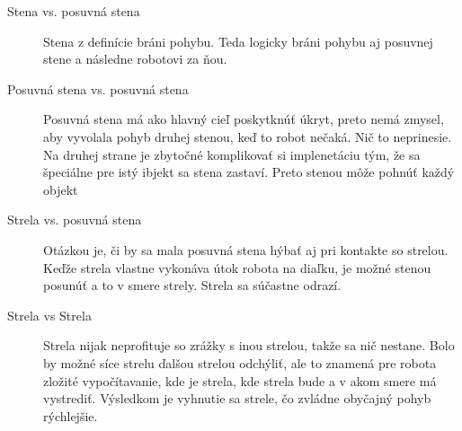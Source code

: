 \begin{description}
\item[Stena vs. posuvná stena] Stena z definície bráni pohybu. Teda logicky bráni pohybu aj posuvnej stene a následne robotovi za ňou.
\item[Posuvná stena vs. posuvná stena] Posuvná stena má ako hlavný cieľ poskytknúť úkryt, preto nemá zmysel, aby vyvolala pohyb druhej stenou, keď to robot nečaká. Nič to neprinesie. Na druhej strane je zbytočné komplikovať si implenetáciu tým, že sa špeciálne pre istý ibjekt sa stena zastaví. Preto stenou môže pohnúť každý objekt
\item[Strela vs. posuvná stena] Otázkou je, či by sa mala posuvná stena hýbať aj pri kontakte so strelou. Keďže strela vlastne vykonáva útok robota na diaľku, je možné stenou posunúť a to v smere strely. Strela sa súčastne odrazí. %
\item [Strela vs Strela] \hfill \newline
Strela nijak neprofituje so zrážky s inou strelou, takže sa nič nestane. Bolo by možné síce strelu ďalšou strelou odchýliť, ale to znamená pre robota zložité vypočítavanie, kde je strela, kde strela bude a v akom smere má vystrediť. Výsledkom je vyhnutie sa strele, čo zvládne obyčajný pohyb rýchlejšie. 
\end{description}
